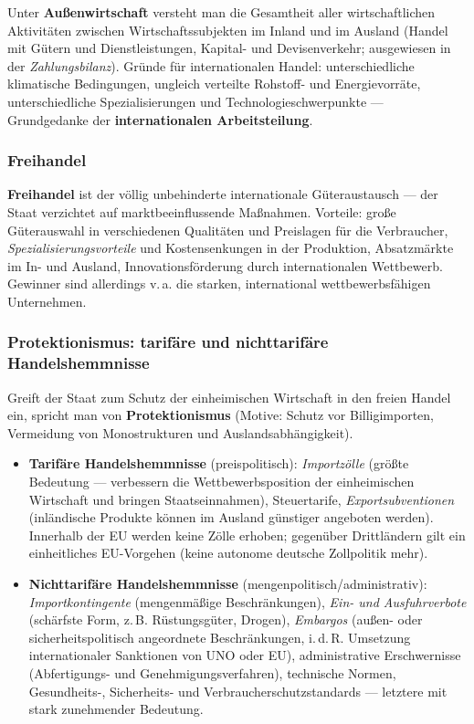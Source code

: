\documentclass[11pt, a4paper]{article}
\begin{document}
Unter \textbf{Außenwirtschaft} versteht man die Gesamtheit aller wirtschaftlichen
Aktivitäten zwischen Wirtschaftssubjekten im Inland und im Ausland (Handel mit Gütern und
Dienstleistungen, Kapital- und Devisenverkehr; ausgewiesen in der \emph{Zahlungsbilanz}).
Gründe für internationalen Handel: unterschiedliche klimatische Bedingungen, ungleich
verteilte Rohstoff- und Energievorräte, unterschiedliche Spezialisierungen und
Technologieschwerpunkte --- Grundgedanke der \textbf{internationalen Arbeitsteilung}.

\subsubsection{Freihandel}

\textbf{Freihandel} ist der völlig unbehinderte internationale Güteraustausch --- der Staat
verzichtet auf marktbeeinflussende Maßnahmen. Vorteile: große Güterauswahl in verschiedenen
Qualitäten und Preislagen für die Verbraucher, \emph{Spezialisierungsvorteile} und
Kostensenkungen in der Produktion, Absatzmärkte im In- und Ausland, Innovationsförderung
durch internationalen Wettbewerb. Gewinner sind allerdings v.\,a. die starken,
international wettbewerbsfähigen Unternehmen.

\subsubsection{Protektionismus: tarifäre und nichttarifäre Handelshemmnisse}

Greift der Staat zum Schutz der einheimischen Wirtschaft in den freien Handel ein, spricht
man von \textbf{Protektionismus} (Motive: Schutz vor Billigimporten, Vermeidung von
Monostrukturen und Auslandsabhängigkeit).

\begin{itemize}
  \item \textbf{Tarifäre Handelshemmnisse} (preispolitisch): \emph{Importzölle} (größte
    Bedeutung --- verbessern die Wettbewerbsposition der einheimischen Wirtschaft und
    bringen Staatseinnahmen), Steuertarife, \emph{Exportsubventionen} (inländische Produkte
    können im Ausland günstiger angeboten werden). Innerhalb der EU werden keine Zölle
    erhoben; gegenüber Drittländern gilt ein einheitliches EU-Vorgehen (keine autonome
    deutsche Zollpolitik mehr).
  \item \textbf{Nichttarifäre Handelshemmnisse} (mengenpolitisch/administrativ):
    \emph{Importkontingente} (mengenmäßige Beschränkungen), \emph{Ein- und Ausfuhrverbote}
    (schärfste Form, z.\,B. Rüstungsgüter, Drogen), \emph{Embargos} (außen- oder
    sicherheitspolitisch angeordnete Beschränkungen, i.\,d.\,R. Umsetzung internationaler
    Sanktionen von UNO oder EU), administrative Erschwernisse (Abfertigungs- und
    Genehmigungsverfahren), technische Normen, Gesundheits-, Sicherheits- und
    Verbraucherschutzstandards --- letztere mit stark zunehmender Bedeutung.
\end{itemize}
\end{document}
